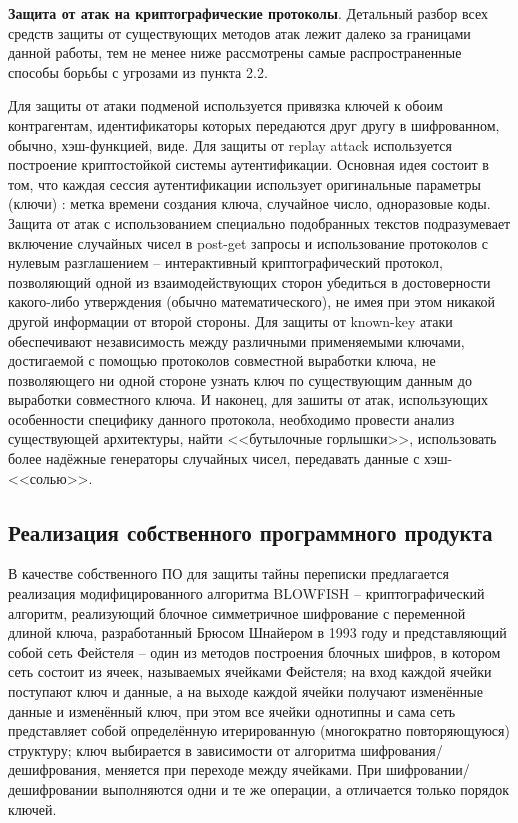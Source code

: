 \textbf{Защита от атак на криптографические протоколы}. Детальный разбор всех средств защиты от существующих методов атак лежит далеко за границами данной работы, тем не менее ниже рассмотрены самые распространенные способы борьбы с угрозами из пункта 2.2.

Для защиты от атаки подменой используется привязка ключей к обоим контрагентам, идентификаторы которых передаются друг другу в шифрованном, обычно, хэш-функцией, виде. Для защиты от replay attack используется  построение криптостойкой системы аутентификации. Основная идея состоит в том, что каждая сессия аутентификации использует оригинальные параметры (ключи) : метка времени создания ключа, случайное число, одноразовые коды. Защита от атак с использованием специально подобранных текстов подразумевает включение случайных чисел в post-get запросы и использование протоколов с нулевым разглашением -- интерактивный криптографический протокол, позволяющий одной из взаимодействующих сторон  убедиться в достоверности какого-либо утверждения (обычно математического), не имея при этом никакой другой информации от второй стороны. Для защиты от known-key атаки обеспечивают независимость  между различными применяемыми ключами, достигаемой с помощью протоколов совместной выработки ключа, не позволяющего ни одной стороне узнать ключ по существующим данным до выработки совместного ключа. И наконец, для зашиты от атак, использующих особенности специфику данного протокола, необходимо провести анализ существующей архитектуры, найти <<бутылочные горлышки>>, использовать более надёжные генераторы случайных чисел, передавать данные с хэш-<<солью>>. \\


\subsection{Реализация собственного программного продукта} 


В качестве собственного ПО для защиты тайны переписки предлагается реализация модифицированного алгоритма BLOWFISH -- криптографический алгоритм, реализующий блочное симметричное шифрование с переменной длиной ключа, разработанный  Брюсом Шнайером в 1993 году и представляющий собой сеть Фейстеля -- один из методов построения блочных шифров, в котором сеть состоит из ячеек, называемых ячейками Фейстеля; на вход каждой ячейки поступают ключ и данные, а на выходе каждой ячейки получают изменённые данные и изменённый ключ, при этом все ячейки однотипны  и  сама  сеть представляет собой определённую итерированную  (многократно повторяющуюся) структуру; ключ выбирается в зависимости от алгоритма шифрования/дешифрования, меняется при переходе между ячейками. При шифровании/ дешифровании выполняются одни и те же операции, а отличается только порядок ключей. 

